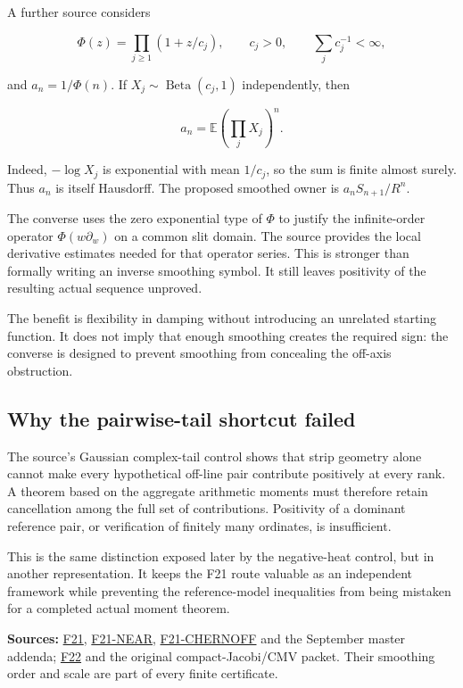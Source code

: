 \documentclass[
  10pt,
  a4paper,
  10pt,
  oneside,
  openany]{book}
\begin{document}
A further source considers

\[
 \Phi(z)=\prod_{j\ge1}(1+z/c_j),\qquad c_j>0,
 \qquad\sum_jc_j^{-1}<\infty,
\]

and \(a_n=1/\Phi(n)\). If \(X_j\sim\operatorname{Beta}(c_j,1)\)
independently, then

\[
 a_n=\mathbb E\left(\prod_jX_j\right)^n.
 \tag{33.4}\label{eq:33.4}
\]

Indeed, \(-\log X_j\) is exponential with mean \(1/c_j\), so the sum is
finite almost surely. Thus \(a_n\) is itself Hausdorff. The proposed
smoothed owner is \(a_nS_{n+1}/R^n\).

The converse uses the zero exponential type of \(\Phi\) to justify the
infinite-order operator \(\Phi(w\partial_w)\) on a common slit domain.
The source provides the local derivative estimates needed for that
operator series. This is stronger than formally writing an inverse
smoothing symbol. It still leaves positivity of the resulting actual
sequence unproved.

The benefit is flexibility in damping without introducing an unrelated
starting function. It does not imply that enough smoothing creates the
required sign: the converse is designed to prevent smoothing from
concealing the off-axis obstruction.

\subsection{Why the pairwise-tail shortcut
failed}\label{why-the-pairwise-tail-shortcut-failed}

The source's Gaussian complex-tail control shows that strip geometry
alone cannot make every hypothetical off-line pair contribute positively
at every rank. A theorem based on the aggregate arithmetic moments must
therefore retain cancellation among the full set of contributions.
Positivity of a dominant reference pair, or verification of finitely
many ordinates, is insufficient.

This is the same distinction exposed later by the negative-heat control,
but in another representation. It keeps the F21 route valuable as an
independent framework while preventing the reference-model inequalities
from being mistaken for a completed actual moment theorem.

\textbf{Sources:} \hyperref[source-f21]{F21},
\hyperref[source-f21-near]{F21-NEAR},
\hyperref[source-f21-chernoff]{F21-CHERNOFF} and the September master
addenda; \hyperref[source-f22]{F22} and the original compact-Jacobi/CMV
packet. Their smoothing order and scale are part of every finite
certificate.
\end{document}
